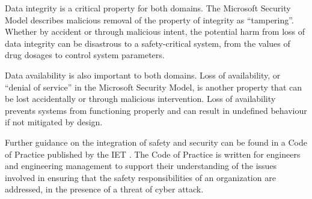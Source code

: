 Data \gls{integrity} is a critical property for both domains. The Microsoft Security Model describes malicious removal of the property of \gls{integrity} as ``tampering''. Whether by accident or through malicious intent, the potential harm from loss of data \gls{integrity} can be disastrous to a safety-critical system, from the values of drug dosages to control system parameters. 

Data \gls{availability} is also important to both domains. Loss of \gls{availability}, or ``denial of service'' in the Microsoft Security Model, is another property that can be lost accidentally or through malicious intervention. Loss of \gls{availability} prevents systems from functioning properly and can result in undefined behaviour if not mitigated by design.

Further guidance on the integration of safety and security can be found in a Code of Practice published by the IET
\cite{citation:IetCyber}.
The Code of Practice is written for engineers and engineering management to support their understanding of the issues
involved in ensuring that the safety responsibilities of an organization are addressed, in the presence of a threat of
cyber attack.
